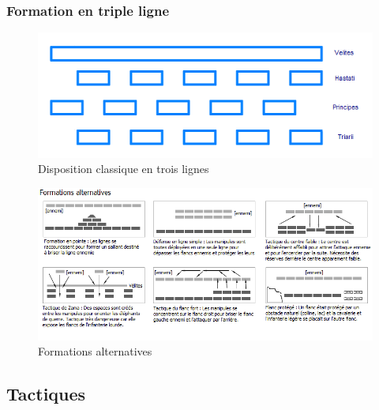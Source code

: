 \documentclass{article}
\begin{document}
\subsubsection{Formation en triple ligne}
\begin{figure}[H]
	\begin{centering}
	\includegraphics[width=\linewidth]{../ressources/Polybian_formation}
	\caption{Disposition classique en trois lignes \cite{roman_infantry_tactics}}
	\end{centering}
\end{figure}
\begin{figure}[H]
	\begin{centering}
	\includegraphics[width=\linewidth]{../ressources/Formations_infanterie_romaine}
	\caption{Formations alternatives \cite{roman_infantry_tactics}}
	\end{centering}
\end{figure}



\subsection{Tactiques}
\end{document}
